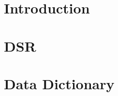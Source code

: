 \documentclass{report}
\begin{document}
\chapter{Introduction}

\chapter{DSR}


\chapter{Data Dictionary}

\end{document}
